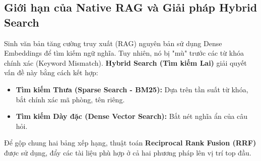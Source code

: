 \subsection{Giới hạn của Native RAG và Giải pháp Hybrid Search}
Sinh văn bản tăng cường truy xuất (RAG) nguyên bản sử dụng Dense Embeddings để tìm kiếm ngữ nghĩa. Tuy nhiên, nó bị "mù" trước các từ khóa chính xác (Keyword Mismatch). 
\textbf{Hybrid Search (Tìm kiếm Lai)} giải quyết vấn đề này bằng cách kết hợp:
\begin{itemize}
    \item \textbf{Tìm kiếm Thưa (Sparse Search - BM25):} Dựa trên tần suất từ khóa, bắt chính xác mã phòng, tên riêng.
    \item \textbf{Tìm kiếm Dày đặc (Dense Vector Search):} Bắt nét nghĩa ẩn của câu hỏi.
\end{itemize}
Để gộp chung hai bảng xếp hạng, thuật toán \textbf{Reciprocal Rank Fusion (RRF)} được sử dụng, đẩy các tài liệu phù hợp ở cả hai phương pháp lên vị trí top đầu.
